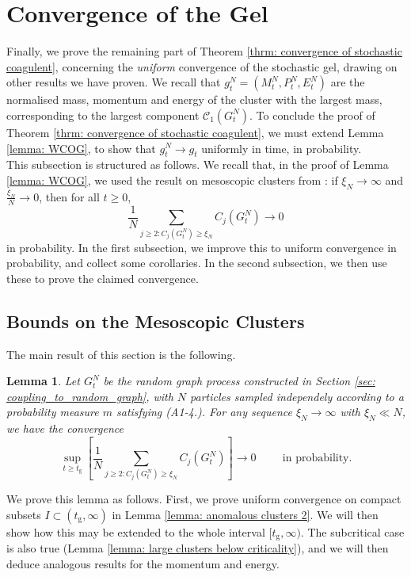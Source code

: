 \documentclass[11pt, notitlepage]{article}
\newtheorem{lem}[thm]{Lemma}
\begin{document}
\section{\textbf{Convergence of the Gel}} \label{sec: COG}
Finally, we prove the remaining part of Theorem \ref{thrm: convergence of stochastic coagulent}, concerning the \emph{uniform} convergence of the stochastic gel, drawing on other results we have proven. We recall that $g^N_t=(M^N_t, P^N_t, E^N_t)$ are the normalised mass, momentum and energy of the cluster with the largest mass, corresponding to the largest component $\mathcal{C}_1(G^N_t).$ To conclude the proof of Theorem \ref{thrm: convergence of stochastic coagulent}, we must extend Lemma \ref{lemma: WCOG}, to show that $g^N_t\rightarrow g_t$ uniformly in time, in probability. \medskip \\ This subsection is structured as follows. We recall that, in the proof of Lemma \ref{lemma: WCOG}, we used the result on mesoscopic clusters from \cite{BJR07}: if $\xi_N\rightarrow \infty$ and $\frac{\xi_N}{N}\rightarrow 0$, then for all $t\ge 0$,  \begin{equation} \frac{1}{N}\sum_{j\ge 2: C_j(G^N_t)\ge \xi_N} C_j(G^N_t)\rightarrow 0 \end{equation} in probability. In the first subsection, we improve this to uniform convergence in probability, and collect some corollaries. In the second subsection, we then use these to prove the claimed convergence.
\subsection{\textbf{Bounds on the Mesoscopic Clusters}} The main result of this section is the following.
\begin{lem} \label{lemma: anomalous clusters} Let $G^N_t$ be the random graph process constructed in Section \ref{sec: coupling_to_random_graph}, with $N$ particles sampled independely according to a probability measure $m$ satisfying (A1-4.). For any sequence $\xi_N\rightarrow \infty$ with $\xi_N\ll N$, we have the convergence \begin{equation}
       \sup_{t \geq t_\mathrm{g}}\left[\frac{1}{N}\sum_{j\geq 2: C_j(G^N_t)\geq \xi_N} C_j(G^N_t)\right] \rightarrow 0 \hspace{1cm}\text{in probability.}\end{equation} 
        \end{lem} 
       
       We prove this lemma as follows. First, we prove uniform convergence  on compact subsets $I\subset (t_\mathrm{g}, \infty)$ in Lemma \ref{lemma: anomalous clusters 2}. We will then show how this may be extended to the whole interval $[t_\mathrm{g}, \infty)$. The subcritical case is also true (Lemma \ref{lemma: large clusters below criticality}), and we will then deduce analogous results for the momentum and energy.
       
\end{document}
